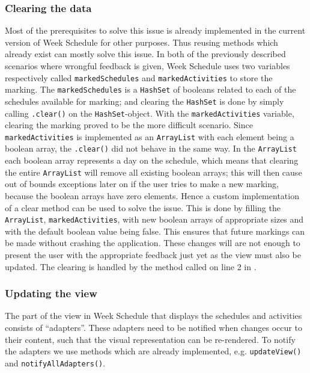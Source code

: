 \subsubsection{Clearing the data}
Most of the prerequisites to solve this issue is already implemented in the current version of Week Schedule for other purposes. 
Thus reusing methods which already exist can mostly solve this issue. 
In both of the previously described scenarios where wrongful feedback is given, Week Schedule uses two variables respectively called \texttt{markedSchedules} and \texttt{markedActivities} to store the marking.
The \texttt{markedSchedules} is a \texttt{HashSet} of booleans related to each of the schedules available for marking; and clearing the \texttt{HashSet} is done by simply calling \texttt{.clear()} on the \texttt{HashSet}-object.
With the \texttt{markedActivities} variable, clearing the marking proved to be the more difficult scenario.
Since \texttt{markedActivities} is implemented as an \texttt{ArrayList} with each element being a boolean array, the \texttt{.clear()} did not behave in the same way.
In the \texttt{ArrayList} each boolean array represents a day on the schedule, which means that clearing the entire \texttt{ArrayList} will remove all existing boolean arrays; this will then cause out of bounds exceptions later on if the user tries to make a new marking, because the boolean arrays have zero elements. 
Hence a custom implementation of a clear method can be used to solve the issue.
This is done by filling the \texttt{ArrayList}, \texttt{markedActivities}, with new boolean arrays of appropriate sizes and with the default boolean value being false.
This ensures that future markings can be made without crashing the application.
These changes will are not enough to present the user with the appropriate feedback just yet as the view must also be updated.
The clearing is handled by the method called on line 2 in .

\subsubsection{Updating the view}
The part of the view in Week Schedule that displays the schedules and activities consists of \enquote{adapters}.
These adapters need to be notified when changes occur to their content, such that the visual representation can be re-rendered.
To notify the adapters we use methods which are already implemented, e.g. \texttt{updateView()} and \texttt{notifyAllAdapters()}.


